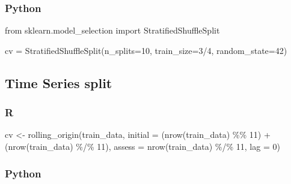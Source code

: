 \documentclass[
  letterpaper,
  DIV=11,
  numbers=noendperiod]{scrreprt}
\newenvironment{Shaded}{\begin{snugshade}}{\end{snugshade}}
\newcommand{\AttributeTok}[1]{\textcolor[rgb]{0.40,0.46,0.14}{#1}}
\newcommand{\DecValTok}[1]{\textcolor[rgb]{0.68,0.00,0.00}{#1}}
\newcommand{\FunctionTok}[1]{\textcolor[rgb]{0.28,0.35,0.67}{#1}}
\newcommand{\ImportTok}[1]{\textcolor[rgb]{0.00,0.46,0.62}{#1}}
\newcommand{\NormalTok}[1]{\textcolor[rgb]{0.00,0.46,0.62}{#1}}
\newcommand{\OperatorTok}[1]{\textcolor[rgb]{0.37,0.37,0.37}{#1}}
\newcommand{\OtherTok}[1]{\textcolor[rgb]{0.00,0.46,0.62}{#1}}
\newcommand{\SpecialCharTok}[1]{\textcolor[rgb]{0.37,0.37,0.37}{#1}}
\begin{document}
\hypertarget{python-59}{%
\subsubsection{Python}\label{python-59}}

\begin{Shaded}
\begin{Highlighting}[]
\ImportTok{from}\NormalTok{ sklearn.model\_selection }\ImportTok{import}\NormalTok{ StratifiedShuffleSplit}

\NormalTok{cv }\OperatorTok{=}\NormalTok{ StratifiedShuffleSplit(n\_splits}\OperatorTok{=}\DecValTok{10}\NormalTok{, train\_size}\OperatorTok{=}\DecValTok{3}\OperatorTok{/}\DecValTok{4}\NormalTok{, random\_state}\OperatorTok{=}\DecValTok{42}\NormalTok{)}
\end{Highlighting}
\end{Shaded}

\hypertarget{time-series-split}{%
\subsection{Time Series split}\label{time-series-split}}

\hypertarget{r-60}{%
\subsubsection{R}\label{r-60}}

\begin{Shaded}
\begin{Highlighting}[]
\NormalTok{cv }\OtherTok{\textless{}{-}} \FunctionTok{rolling\_origin}\NormalTok{(train\_data, }
                     \AttributeTok{initial =}\NormalTok{ (}\FunctionTok{nrow}\NormalTok{(train\_data) }\SpecialCharTok{\%\%} \DecValTok{11}\NormalTok{) }\SpecialCharTok{+}\NormalTok{ (}\FunctionTok{nrow}\NormalTok{(train\_data) }\SpecialCharTok{\%/\%} \DecValTok{11}\NormalTok{), }
                     \AttributeTok{assess =} \FunctionTok{nrow}\NormalTok{(train\_data) }\SpecialCharTok{\%/\%} \DecValTok{11}\NormalTok{, }
                     \AttributeTok{lag =} \DecValTok{0}\NormalTok{)}
\end{Highlighting}
\end{Shaded}

\hypertarget{python-60}{%
\subsubsection{Python}\label{python-60}}
\end{document}
